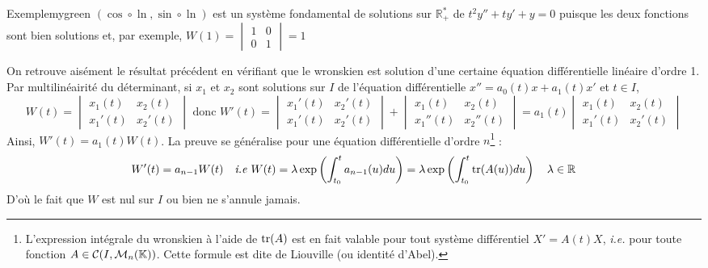     \begin{omed}{Exemple}{mygreen}
        $(\cos \circ \ln, \sin \circ \ln)$ est un système fondamental de solutions sur $\mathbb{R}^*_+$ de $t^2 y'' + ty' + y = 0$ puisque les deux fonctions sont bien solutions et, par exemple, $W(1) = \begin{vmatrix}
            1 & 0 \\
            0 & 1
        \end{vmatrix} = 1$
    \end{omed}

    On retrouve aisément le résultat précédent en vérifiant que le wronskien est solution d’une certaine équation différentielle linéaire d’ordre 1. Par multilinéairité du déterminant, si $x_1$ et $x_2$ sont solutions sur $I$ de l’équation différentielle $x'' = a_0(t)x + a_1(t)x'$ et $t \in I$, 
    \[ W(t) = \begin{vmatrix}
        x_1(t) & x_2(t) \\
        x_1'(t) & x_2'(t)
    \end{vmatrix} \text{ donc } W'(t) = \begin{vmatrix}
        x_1'(t) & x_2'(t) \\
        x_1'(t) & x_2'(t)
    \end{vmatrix} + \begin{vmatrix}
        x_1(t) & x_2(t) \\
        x_1''(t) & x_2''(t)
    \end{vmatrix} = a_1(t) \begin{vmatrix}
        x_1(t) & x_2(t) \\
        x_1'(t) & x_2'(t)
    \end{vmatrix} \] 
    Ainsi, $W'(t) = a_1(t) W(t)$. La preuve se généralise pour une équation différentielle d’ordre $n$\footnote[2]{L’expression intégrale du wronskien à l’aide de $\operatorname{tr}(A)$ est en fait valable pour tout système différentiel $X' = A(t)X$, \textit{i.e.} pour toute fonction $A \in \mathcal{C}(I,\mathcal{M}_{n}(\mathbb{K}))$. Cette formule est dite de Liouville (ou identité d’Abel).} :
    \[ W'(t) = a_{n-1}W(t) \quad \textit{i.e } W(t) = \lambda \exp\left(\int_{t_0}^{t}a_{n-1}(u)du\right) = \lambda \exp\left(\int_{t_0}^{t} \operatorname{tr}(A(u))du\right) \quad \lambda \in \mathbb{R} \]
    D’où le fait que $W$ est nul sur $I$ ou bien ne s’annule jamais.

